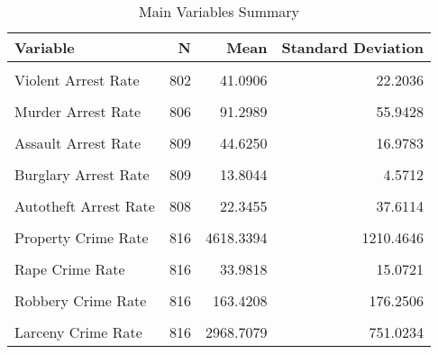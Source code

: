 \begin{table}[H]

\caption{\label{tab:tab:replicatetable2a}Main Variables Summary}
\centering
\begin{tabular}[t]{lrrr}
\toprule
Variable & N & Mean & Standard Deviation\\
\midrule
\cellcolor{gray!6}{Shalll} & \cellcolor{gray!6}{816} & \cellcolor{gray!6}{0.1912} & \cellcolor{gray!6}{0.3935}\\
Violent Arrest Rate & 802 & 41.0906 & 22.2036\\
\cellcolor{gray!6}{Property Arrest Rate} & \cellcolor{gray!6}{809} & \cellcolor{gray!6}{16.9180} & \cellcolor{gray!6}{4.6770}\\
Murder Arrest Rate & 806 & 91.2989 & 55.9428\\
\cellcolor{gray!6}{Rape Arrest Rate} & \cellcolor{gray!6}{799} & \cellcolor{gray!6}{41.0231} & \cellcolor{gray!6}{17.3887}\\
\addlinespace
Assault Arrest Rate & 809 & 44.6250 & 16.9783\\
\cellcolor{gray!6}{Robery Arrest Rate} & \cellcolor{gray!6}{808} & \cellcolor{gray!6}{31.4581} & \cellcolor{gray!6}{13.5928}\\
Burglary Arrest Rate & 809 & 13.8044 & 4.5712\\
\cellcolor{gray!6}{Larceny Arrest Rate} & \cellcolor{gray!6}{809} & \cellcolor{gray!6}{18.5372} & \cellcolor{gray!6}{5.1961}\\
Autotheft Arrest Rate & 808 & 22.3455 & 37.6114\\
\addlinespace
\cellcolor{gray!6}{Violent Crime Rate} & \cellcolor{gray!6}{816} & \cellcolor{gray!6}{483.9260} & \cellcolor{gray!6}{318.9425}\\
Property Crime Rate & 816 & 4618.3394 & 1210.4646\\
\cellcolor{gray!6}{Murder Crime Rate} & \cellcolor{gray!6}{816} & \cellcolor{gray!6}{7.7683} & \cellcolor{gray!6}{6.8817}\\
Rape Crime Rate & 816 & 33.9818 & 15.0721\\
\cellcolor{gray!6}{Assault Crime Rate} & \cellcolor{gray!6}{816} & \cellcolor{gray!6}{278.7551} & \cellcolor{gray!6}{159.6495}\\
\addlinespace
Robbery Crime Rate & 816 & 163.4208 & 176.2506\\
\cellcolor{gray!6}{Burglary Crime Rate} & \cellcolor{gray!6}{816} & \cellcolor{gray!6}{1239.3364} & \cellcolor{gray!6}{417.7576}\\
Larceny Crime Rate & 816 & 2968.7079 & 751.0234\\

\end{tabular}
\end{table}
